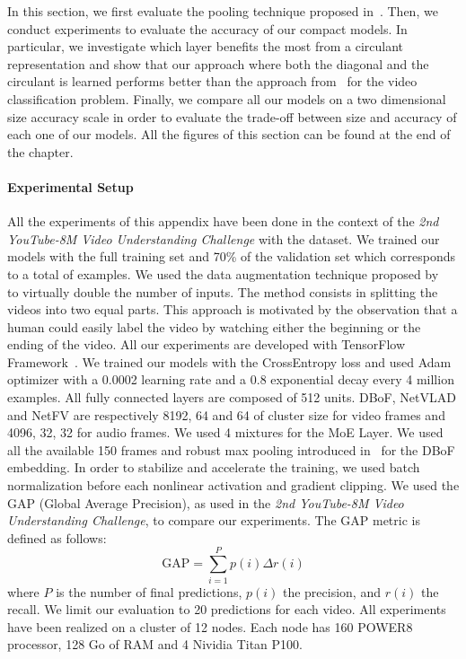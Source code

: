 In this section, we first evaluate the pooling technique proposed in~.
Then, we conduct experiments to evaluate the accuracy of our compact models.
In particular, we investigate which layer benefits the most from a circulant representation and show that our approach where both the diagonal and the circulant is learned performs better than the approach from~\citet{cheng2015exploration} for the video classification problem.
Finally, we compare all our models on a two dimensional size \vs accuracy scale in order to evaluate the trade-off between size and accuracy of each one of our models.
All the figures of this section can be found at the end of the chapter.


\paragraph{Experimental Setup}

All the experiments of this appendix have been done in the context of the \emph{2nd YouTube-8M Video Understanding Challenge} with the \yt dataset.
We trained our models with the full training set and 70\% of the validation set which corresponds to a total of  examples.
We used the data augmentation technique proposed by~\citet{skalic2017deep} to virtually double the number of inputs. 
The method consists in splitting the videos into two equal parts.
This approach is motivated by the observation that a human could easily label the video by watching either the beginning or the ending of the video. 
All our experiments are developed with TensorFlow Framework~\cite{tensorflow2015-whitepaper}.
We trained our models with the CrossEntropy loss and used Adam optimizer with a 0.0002 learning rate and a 0.8 exponential decay every 4 million examples.
All fully connected layers are composed of 512 units.
DBoF, NetVLAD and NetFV are respectively 8192, 64 and 64 of cluster size for video frames and 4096, 32, 32 for audio frames.
We used 4 mixtures for the MoE Layer.
We used all the available 150 frames and robust max pooling introduced in~ for the DBoF embedding.
In order to stabilize and accelerate the training, we used batch normalization before each nonlinear activation and gradient clipping. 
We used the GAP (Global Average Precision), as used in the \emph{2nd YouTube-8M Video Understanding Challenge}, to compare our experiments.
The GAP metric is defined as follows:
\begin{equation}
  \text{GAP} = \sum_{i=1}^{P}p(i) \Delta r(i)
\end{equation}
where $P$ is the number of final predictions, $p(i)$ the precision, and $r(i)$ the recall.
We limit our evaluation to 20 predictions for each video. 
All experiments have been realized on a cluster of 12 nodes. Each node has 160 POWER8 processor, 128 Go of RAM and 4 Nividia Titan P100.


